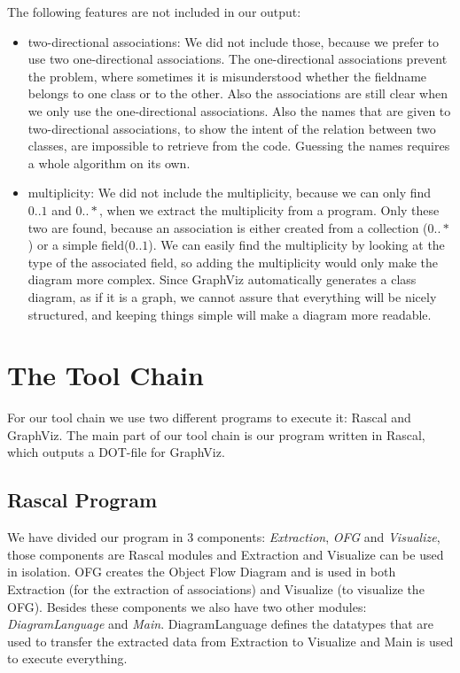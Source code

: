 \documentclass[a4paper,11pt]{article}
\begin{document}
			The following features are not included in our output:
			\begin{itemize}
				\item two-directional associations: We did not include those, because we prefer to use two one-directional associations. The one-directional associations prevent the problem, where sometimes it is misunderstood whether the fieldname belongs to one class or to the other. Also the associations are still clear when we only use the one-directional associations. Also the names that are given to two-directional associations, to show the intent of the relation between two classes, are impossible to retrieve from the code. Guessing the names requires a whole algorithm on its own.
				\item multiplicity: We did not include the multiplicity, because we can only find $0..1$ and $0..*$, when we extract the multiplicity from a program. Only these two are found, because an association is either created from a collection ($0..*$) or a simple field($0..1$). We can easily find the multiplicity by looking at the type of the associated field, so adding the multiplicity would only make the diagram more complex. Since GraphViz automatically generates a class diagram, as if it is a graph, we cannot assure that everything will be nicely structured, and keeping things simple will make a diagram more readable. 
			\end{itemize}
		
	\section{The Tool Chain}
		For our tool chain we use two different programs to execute it: Rascal and GraphViz. The main part of our tool chain is our program written in Rascal, which outputs a DOT-file for GraphViz.
		
		\subsection{Rascal Program}
			We have divided our program in 3 components: \emph{Extraction}, \emph{OFG} and \emph{Visualize}, those components are Rascal modules and Extraction and Visualize can be used in isolation. OFG creates the Object Flow Diagram and is used in both Extraction (for the extraction of associations) and Visualize (to visualize the OFG). Besides these components we also have two other modules: \emph{DiagramLanguage} and \emph{Main}. DiagramLanguage defines the datatypes that are used to transfer the extracted data from Extraction to Visualize and Main is used to execute everything. \\
	
\end{document}
